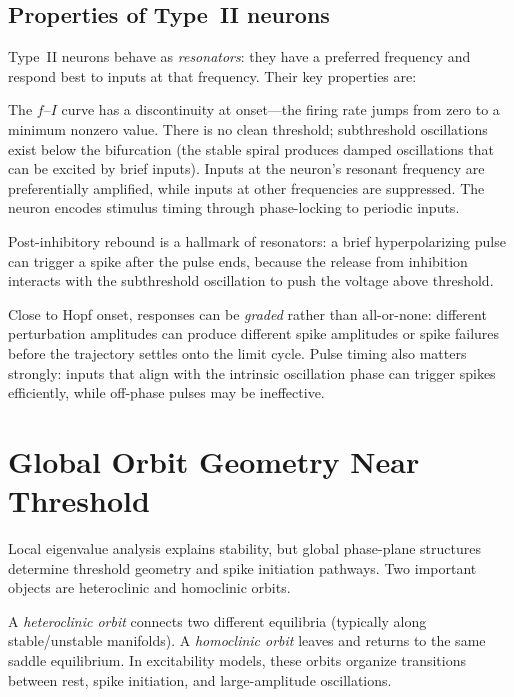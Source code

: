 \subsection{Properties of Type~II neurons}

Type~II neurons behave as \emph{resonators}: they have a preferred frequency and respond best to inputs at that frequency. Their key properties are:

The $f$--$I$ curve has a discontinuity at onset---the firing rate jumps from zero to a minimum nonzero value. There is no clean threshold; subthreshold oscillations exist below the bifurcation (the stable spiral produces damped oscillations that can be excited by brief inputs). Inputs at the neuron's resonant frequency are preferentially amplified, while inputs at other frequencies are suppressed. The neuron encodes stimulus timing through phase-locking to periodic inputs.

Post-inhibitory rebound is a hallmark of resonators: a brief hyperpolarizing pulse can trigger a spike after the pulse ends, because the release from inhibition interacts with the subthreshold oscillation to push the voltage above threshold.

Close to Hopf onset, responses can be \emph{graded} rather than all-or-none: different perturbation amplitudes can produce different spike amplitudes or spike failures before the trajectory settles onto the limit cycle. Pulse timing also matters strongly: inputs that align with the intrinsic oscillation phase can trigger spikes efficiently, while off-phase pulses may be ineffective.

\section{Global Orbit Geometry Near Threshold}
\label{sec:global-geometry}

Local eigenvalue analysis explains stability, but global phase-plane structures determine threshold geometry and spike initiation pathways. Two important objects are heteroclinic and homoclinic orbits.

A \emph{heteroclinic orbit} connects two different equilibria (typically along stable/unstable manifolds). A \emph{homoclinic orbit} leaves and returns to the same saddle equilibrium. In excitability models, these orbits organize transitions between rest, spike initiation, and large-amplitude oscillations.

